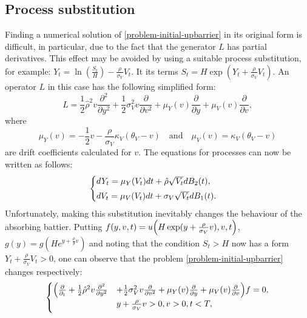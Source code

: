 \documentclass[a4paper]{jpconf}
\begin{document}
{\subsection{Process substitution}
Finding a numerical solution of \eqref{problem-initial-upbarrier} in its original form is difficult, in particular, due to the fact that the generator $L$ has partial derivatives. This effect may be avoided by using a suitable process substitution, for example: $Y_t = \ln(\frac{S_t}{H}) - \frac{\rho}{\sigma_V}V_t.$ It its terms $S_t = H \exp(Y_t + \frac{\rho}{\sigma_V}V_t).$
An operator $L$ in this case has the following simplified form:
\begin{equation*}
L = \frac{1}{2}\hat{\rho}^2 v \frac{\partial^2}{\partial y^2} +
\frac{1}{2}\sigma^2_V v\frac{\partial}{\partial v^2} + 
\mu_Y(v)\frac{\partial}{\partial y} + 
\mu_V(v)\frac{\partial}{\partial v},
\end{equation*}
where 
$$\mu_Y(v) = - \frac{1}{2}v - \frac{\rho}{\sigma_V}\kappa_V(\theta_V - v) \quad \textrm{and} \quad  \mu_V(v) = \kappa_V(\theta_V - v)$$ are drift coefficients calculated for $v$. The equations for processes can now be written as follows:
\begin{equation}{\label{system-subst}}
\begin{array}{l}
\begin{cases}
d Y_t = \mu_Y(V_t)dt+\hat{\rho}\sqrt{V_t} dB_2(t),
\smallskip\\
dV_t= \mu_V(V_t)dt+\sigma_V\sqrt{V_t}dB_1(t).
\end{cases}
\end{array}
\end{equation}	
Unfortunately, making this substitution inevitably changes the behaviour of the absorbing battier. Putting $f(y,v,t)=u\Bigl(H \exp(y + \frac{\rho}{\sigma_V}v),v,t\Bigr)$, 
$g(y) = g(He^{y+\frac{\rho}{\sigma}v})$ and noting that the condition $S_t > H$ now has a form $Y_t + \frac{\rho}{\sigma_V} V_t > 0$, one can observe that the problem \eqref{problem-initial-upbarrier} changes respectively:
\begin{equation}
\begin{array}{l}
\begin{cases}
\Bigl(\frac{\partial}{\partial_t} + \frac{1}{2}\hat{\rho}^2 v \frac{\partial^2}{\partial y^2} &+
\frac{1}{2}\sigma^2_V v\frac{\partial}{\partial v^2} + 
\mu_Y(v)\frac{\partial}{\partial y} + 
\mu_V(v)\frac{\partial}{\partial v}\Bigr) f = 0, \\
\smallskip
& y +\frac{\rho}{\sigma_V}v >0, v > 0,  t < T, \\

\end{cases}
\end{array}
\end{equation}}
\end{document}
